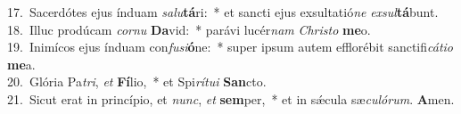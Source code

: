 {17.~}Sacerdótes ejus índuam \textit{sa}\textit{lu}\textbf{tá}ri:~* et sancti ejus exsultatió\textit{ne} \textit{ex}\textit{sul}\textbf{tá}bunt.\\
{18.~}Illuc prodúcam \textit{cor}\textit{nu} \textbf{Da}vid:~* parávi lucér\textit{nam} \textit{Chri}\textit{sto} \textbf{me}o.\\
{19.~}Inimícos ejus índuam con\textit{fu}\textit{si}\textbf{ó}ne:~* super ipsum autem efflorébit sanctifi\textit{cá}\textit{ti}\textit{o} \textbf{me}a.\\
{20.~}Glória Pa\textit{tri}, \textit{et} \textbf{Fí}lio,~* et Spi\textit{rí}\textit{tu}\textit{i} \textbf{San}cto.\\
{21.~}Sicut erat in princípio, et \textit{nunc}, \textit{et} \textbf{sem}per,~* et in sǽcula sæ\textit{cu}\textit{ló}\textit{rum}. \textbf{A}men.\\
